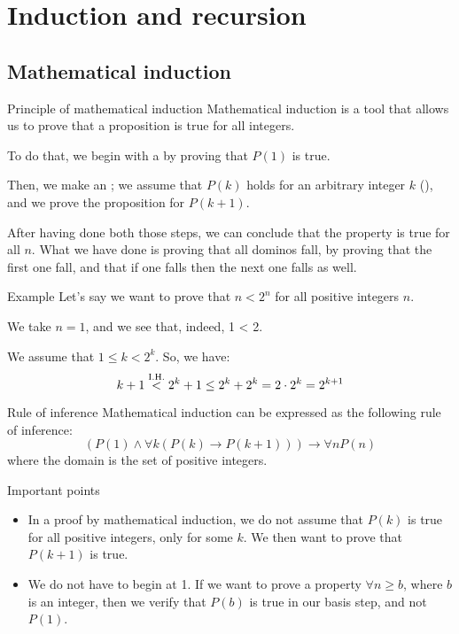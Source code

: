 \documentclass[a4paper]{article}
\begin{document}
\section{Induction and recursion}
\subsection{Mathematical induction}
\begin{parag}{Principle of mathematical induction}
    Mathematical induction is a tool that allows us to prove that a proposition is true for all integers.

    To do that, we begin with a  by proving that $P\left(1\right)$ is true.

    Then, we make an ; we assume that $P\left(k\right)$ holds for an arbitrary integer $k$ (), and we prove the proposition for $P\left(k+1\right)$.

    After having done both those steps, we can conclude that the property is true for all $n$. What we have done is proving that all dominos fall, by proving that the first one fall, and that if one falls then the next one falls as well.
\end{parag}

\begin{parag}{Example}
    Let's say we want to prove that $n < 2^n$ for all positive integers $n$.

     We take $n = 1$, and we see that, indeed, 1 < 2.

     We assume that $1 \leq k < 2^k$. So, we have:
    \[k + 1 \over{<}{I.H.}  2^k + 1 \leq 2^k + 2^k = 2\cdot 2^k = 2^{k+1}\]
\end{parag}

\begin{parag}{Rule of inference}
    Mathematical induction can be expressed as the following rule of inference:
    \[\left(P\left(1\right) \land \forall k\left(P\left(k\right) \to P\left(k+1\right)\right)\right) \to \forall n P\left(n\right)\]
    where the domain is the set of positive integers.
\end{parag}

\begin{parag}{Important points}
    \begin{itemize}[left=0pt]
        \item  In a proof by mathematical induction, we do not assume that $P\left(k\right)$ is true for all positive integers, only for some $k$. We then want to prove that $P\left(k+1\right)$ is true.
        \item We do not have to begin at 1. If we want to prove a property $\forall n \geq b$, where $b$ is an integer, then we verify that $P\left(b\right)$ is true in our basis step, and not $P\left(1\right)$.
    \end{itemize}
\end{parag}
\end{document}
